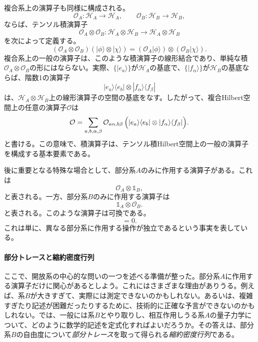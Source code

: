 \documentclass[a4paper,11pt,oneside]{article}
\theoremstyle{definition}
\numberwithin{equation}{section}
\renewcommand{\O}{\mathcal{O}}
\begin{document}
複合系上の演算子も同様に構成される。
\begin{equation}
\O_{A} : \mathcal H_A \to \mathcal H_A,
\qquad
\O_{B} : \mathcal H_B \to \mathcal H_B,
\end{equation}
ならば、テンソル積演算子
\begin{equation}
\O_{A} \otimes \O_{B} : \mathcal H_A \otimes \mathcal H_B \to \mathcal H_A \otimes \mathcal H_B
\end{equation}
を次によって定義する。
\begin{equation}
(\O_{A} \otimes \O_{B})(|\phi\rangle \otimes |\chi\rangle)
=
(\O_{A}|\phi\rangle)\otimes(\O_{B}|\chi\rangle).
\end{equation}
複合系上の一般の演算子は、このような積演算子の線形結合であり、単純な積$\O_A\otimes \O_B$の形にはならない。実際、$\{|e_a\rangle\}$が$\mathcal H_A$の基底で、$\{|f_\alpha\rangle\}$が$\mathcal H_B$の基底ならば、階数1の演算子
\begin{equation}
|e_a\rangle\langle e_b| \otimes |f_\alpha\rangle\langle f_\beta|
\end{equation}
は、$\mathcal H_A\otimes \mathcal H_B$上の線形演算子の空間の基底をなす。したがって、複合Hilbert空間上の任意の演算子$\O$は
\begin{equation}
\O
=
\sum_{a,b,\alpha,\beta}
\O_{a\alpha,b\beta}\,
\Bigl(|e_a\rangle\langle e_b| \otimes |f_\alpha\rangle\langle f_\beta|\Bigr) .
\end{equation}
と書ける。この意味で、積演算子は、テンソル積Hilbert空間上の一般の演算子を構成する基本要素である。



後に重要となる特殊な場合として、部分系$A$のみに作用する演算子がある。これは
\begin{equation}
\O_{A} \otimes \mathds{1} _B ,
\end{equation}
と表される。一方、部分系$B$のみに作用する演算子は
\begin{equation}
\mathds{1} _A \otimes \O_{B} .
\end{equation}
と表される。このような演算子は可換である。
\begin{equation}
[\O_{A} \otimes \mathds{1} _B,\mathds{1} _A \otimes \O_{B}]=0 .
\end{equation}
これは単に、異なる部分系に作用する操作が独立であるという事実を表している。



\paragraph{部分トレースと縮約密度行列} ここで、開放系の中心的な問いの一つを述べる準備が整った。部分系$A$に作用する演算子だけに関心があるとしよう。これにはさまざまな理由がありうる。例えば、系$ B$が大きすぎて、実際には測定できないのかもしれない。あるいは、複雑すぎたり記述が困難だったりするために、技術的に正確な予言ができないのかもしれない。では、一般には系$ B$とやり取りし、相互作用しうる系$A $の量子力学について、どのように数学的記述を定式化すればよいだろうか。その答えは、部分系$B$の自由度について\textit{部分トレース}を取って得られる\textit{縮約密度行列}である。
\end{document}
